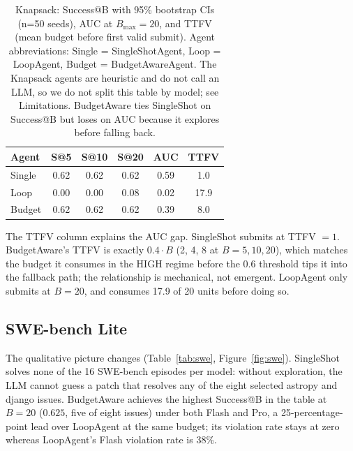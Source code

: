 \documentclass[journal=jacsat,manuscript=article]{achemso}
\begin{document}
\begin{table}
  \centering
  \caption{Knapsack: Success@B with 95\% bootstrap CIs (n=50 seeds),
  AUC at $B_\text{max}=20$, and TTFV (mean budget before first valid
  submit). Agent abbreviations: Single = SingleShotAgent, Loop =
  LoopAgent, Budget = BudgetAwareAgent. The Knapsack agents are
  heuristic and do not call an LLM, so we do not split this table by
  model; see Limitations. BudgetAware ties SingleShot on Success@B
  but loses on AUC because it explores before falling back.}
  \label{tab:knapsack}
  \footnotesize
  \begin{tabular}{lccccc}
    \toprule
    Agent & S@5 & S@10 & S@20 & AUC & TTFV \\
    \midrule
    Single  & 0.62 & 0.62 & 0.62 & 0.59 & 1.0 \\
    Loop    & 0.00 & 0.00 & 0.08 & 0.02 & 17.9 \\
    Budget  & 0.62 & 0.62 & 0.62 & 0.39 & 8.0 \\
    \bottomrule
  \end{tabular}
\end{table}

The TTFV column explains the AUC gap. SingleShot submits at TTFV
$= 1$. BudgetAware's TTFV is exactly $0.4 \cdot B$ (2, 4, 8 at
$B = 5, 10, 20$), which matches the budget it consumes in the HIGH
regime before the $0.6$ threshold tips it into the fallback path; the
relationship is mechanical, not emergent. LoopAgent only submits at
$B = 20$, and consumes 17.9 of 20 units before doing so.

\subsection{SWE-bench Lite}
The qualitative picture changes (Table~\ref{tab:swe},
Figure~\ref{fig:swe}). SingleShot solves none of the 16 SWE-bench
episodes per model: without exploration, the LLM cannot guess a
patch that resolves any of the eight selected astropy and django
issues. BudgetAware achieves the highest Success@B in the table at
$B = 20$ ($0.625$, five of eight issues) under both Flash and Pro,
a 25-percentage-point lead over LoopAgent at the same budget; its
violation rate stays at zero whereas LoopAgent's Flash violation
rate is 38\%.
\end{document}
